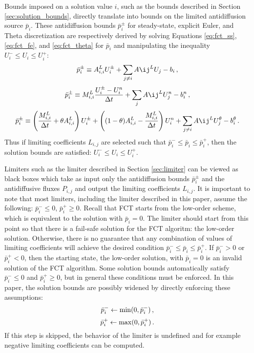 Bounds imposed on a solution value $i$, such as the bounds described in Section
\ref{sec:solution_bounds}, directly translate into bounds on the limited
antidiffusion source $\bar{p}_i$. These antidiffusion bounds $\bar{p}_i^\pm$ for steady-state,
explicit Euler, and Theta discretization are respectively derived by
solving Equations \eqref{eq:fct_ss}, \eqref{eq:fct_fe}, and \eqref{eq:fct_theta}
for $\bar{p}_i$ and manipulating the inequality $U^-_i\leq U_i\leq U^+_i$:
\begin{equation}
  \bar{p}_i^\pm \equiv A_{i,i}^L U_i^\pm
    + \sumjnoti A\ij^L U_j - b_i \eqc
\end{equation}
\begin{equation}
  \bar{p}_i^\pm \equiv M^L_{i,i}
    \frac{U_i^\pm - U_i^n}{\dt}
  + \sumj A\ij^L U_j^n
  - b_i^n \eqc
\end{equation}
\begin{equation}
  \bar{p}_i^\pm \equiv
   \pr{\frac{M^L_{i,i}}{\dt}+\theta A_{i,i}^L}
     U_i^\pm
    + \pr{(1-\theta) A_{i,i}^L-\frac{M^L_{i,i}}{\dt}}
     U_i^n
  +\sumjnoti A\ij^L U_j^\theta
  -b_i^\theta
  \eqp
\end{equation}
Thus if limiting coefficients $L_{i,j}$ are selected such that
$\bar{p}_i^-\leq \bar{p}_i\leq \bar{p}_i^+$, then the solution bounds are
satisfied: $U^-_i\leq U_i\leq U^+_i$.

Limiters such as the limiter described in Section \ref{sec:limiter} can be
viewed as black boxes which take as input only the antidiffusion bounds
$\bar{p}_i^\pm$ and the antidiffusive fluxes $P_{i,j}$ and output the
limiting coefficients $L_{i,j}$. It is important to note that most limiters,
including the limiter described in this paper, assume the following:
$\bar{p}_i^-\leq 0$, $\bar{p}_i^+\geq 0$. Recall that FCT starts from the
low-order scheme, which is equivalent to the solution with $\bar{p}_i=0$.
The limiter should start from this point so that there is a fail-safe solution
for the FCT algoritm: the low-order solution. Otherwise, there is no guarantee
that any combination of values of limiting coefficients will achieve
the desired condition $\bar{p}_i^-\leq \bar{p}_i\leq \bar{p}_i^+$. If
$\bar{p}_i^- > 0$ or $\bar{p}_i^+ < 0$, then the starting state, the low-order
solution, with $\bar{p}_i=0$ is an invalid solution of the FCT algorithm.
Some solution bounds automatically satisfy $\bar{p}_i^-\leq 0$ and $\bar{p}_i^+\geq 0$,
but in general these conditions must be enforced. In this paper, the solution
bounds are possibly widened by directly enforcing these assumptions:
\begin{equation}
  \bar{p}_i^- \gets \min(0,\bar{p}_i^-) \,,
\end{equation}
\begin{equation}
  \bar{p}_i^+ \gets \max(0,\bar{p}_i^+) \,.
\end{equation}
If this step is skipped, the behavior of the limiter is undefined and for example
negative limiting coefficients can be computed.


